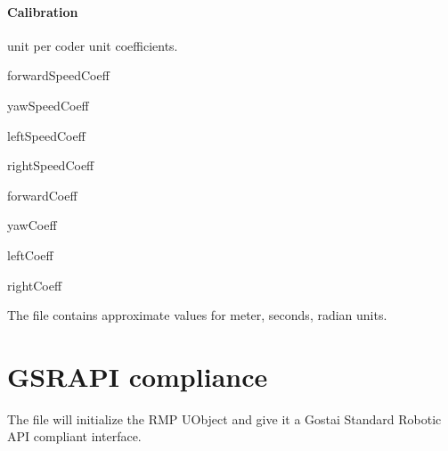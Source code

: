 \paragraph{Calibration}

\urbi unit per coder unit coefficients.

\begin{urbiscriptapi}
\item[forwardSpeedCoeff]
\item[yawSpeedCoeff]
\item[leftSpeedCoeff]
\item[rightSpeedCoeff]
\item[forwardCoeff]
\item[yawCoeff]
\item[leftCoeff]
\item[rightCoeff]
\end{urbiscriptapi}

The file  contains approximate values for meter, seconds,
radian units.


\section{GSRAPI compliance}

The file  will initialize the RMP UObject and give it a Gostai
Standard Robotic API compliant interface.


